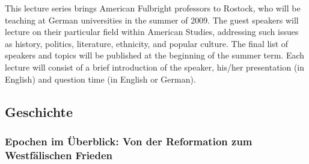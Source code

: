 \documentclass[%
a4paper, %
11pt,               %
leqno,              %
fleqn,              %
]
{scrartcl}
\begin{document}
This lecture series brings American Fulbright professors to Rostock, who will be
teaching at German universities in the summer of 2009. The guest speakers will
lecture on their particular field within American Studies, addressing such
issues as history, politics, literature, ethnicity, and popular culture. The
final list of speakers and topics will be published at the beginning of the
summer term. Each lecture will consist of a brief introduction of the speaker,
his/her presentation (in English) and question time (in English or German).



\subsection{Geschichte} %
\label{sub:Geschichte}

\subsubsection{Epochen im Überblick: Von der Reformation zum Westfälischen
Frieden} %
\label{ssub:Epochen im Überblick: Von der Reformation zum Westfälischen Frieden}
\end{document}

